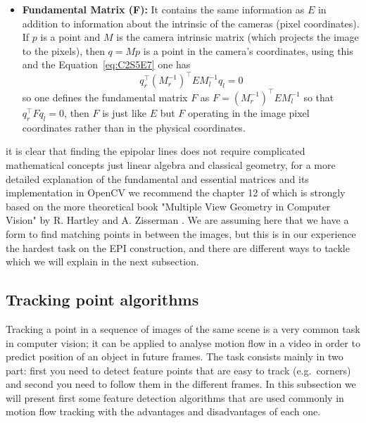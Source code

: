 \begin{itemize}
\item \textbf{Fundamental Matrix (F):} It contains the same information as $E$ in addition to information about the intrinsic of the cameras (pixel coordinates). If $p$ is a point and $M$ is the camera intrinsic matrix (which projects the image to the pixels), then $q=Mp$ is a point in the camera's coordinates, using this and the Equation~\ref{eq:C2S5E7} one has 
\begin{equation}
\label{eq:C2S5E8}
q_r^{\intercal}(M_r^{-1})^{\intercal}E M_l^{-1}q_l=0
\end{equation}
so one defines the fundamental matrix $F$ as $F=(M_r^{-1})^{\intercal}EM_l^{-1}$ so that $q_r^{\intercal}Fq_l=0$, then $F$ is just like $E$ but $F$ operating in the image pixel coordinates rather than in the physical coordinates.
\end{itemize}
it is clear that finding the epipolar lines does not require complicated mathematical concepts just linear algebra and classical geometry, for a more detailed explanation of the fundamental and essential matrices and its implementation in OpenCV we recommend the chapter 12 of \cite{LearnOpenCV} which is strongly based on the more theoretical book "Multiple View Geometry in Computer Vision" by R. Hartley and A. Zisserman \cite{MultipleView}. We are assuming here that we have a form to find matching points in between the images, but this is in our experience the hardest task on the EPI construction, and there are different ways to tackle which we will explain in the next subsection. 

\subsection{Tracking point algorithms}
\label{sec:track_alg}

Tracking a point in a sequence of images of the same scene is a very common task in computer vision; it can be applied to analyse motion flow in a video in order to predict position of an object in future frames. The task consists mainly in two part: first you need to detect feature points that are easy to track (e.g.\ corners) and second you need to follow them in the different frames. In this subsection we will present first some feature detection algorithms that are used commonly in motion flow tracking with the advantages and disadvantages of each one. 

